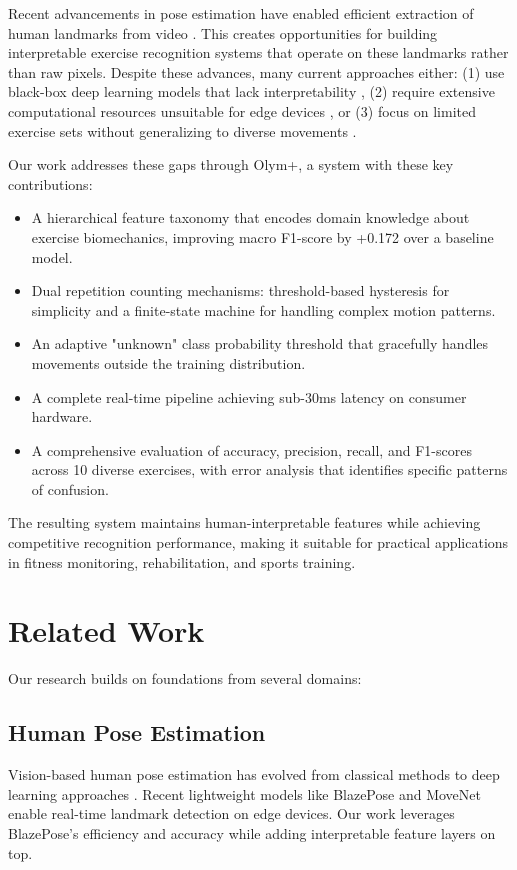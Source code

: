 \documentclass[conference]{IEEEtran}
\begin{document}
Recent advancements in pose estimation have enabled efficient extraction of human landmarks from video \cite{blazepose}. This creates opportunities for building interpretable exercise recognition systems that operate on these landmarks rather than raw pixels. Despite these advances, many current approaches either: (1) use black-box deep learning models that lack interpretability \cite{deep_har}, (2) require extensive computational resources unsuitable for edge devices \cite{resource_heavy}, or (3) focus on limited exercise sets without generalizing to diverse movements \cite{limited_scope}.

Our work addresses these gaps through Olym+, a system with these key contributions:

\begin{itemize}
    \item A hierarchical feature taxonomy that encodes domain knowledge about exercise biomechanics, improving macro F1-score by +0.172 over a baseline model.
    \item Dual repetition counting mechanisms: threshold-based hysteresis for simplicity and a finite-state machine for handling complex motion patterns.
    \item An adaptive "unknown" class probability threshold that gracefully handles movements outside the training distribution.
    \item A complete real-time pipeline achieving sub-30ms latency on consumer hardware.
    \item A comprehensive evaluation of accuracy, precision, recall, and F1-scores across 10 diverse exercises, with error analysis that identifies specific patterns of confusion.
\end{itemize}

The resulting system maintains human-interpretable features while achieving competitive recognition performance, making it suitable for practical applications in fitness monitoring, rehabilitation, and sports training.

\section{Related Work}
Our research builds on foundations from several domains:

\subsection{Human Pose Estimation}
Vision-based human pose estimation has evolved from classical methods to deep learning approaches \cite{pose_survey}. Recent lightweight models like BlazePose \cite{blazepose} and MoveNet \cite{movenet} enable real-time landmark detection on edge devices. Our work leverages BlazePose's efficiency and accuracy while adding interpretable feature layers on top.
\end{document}
